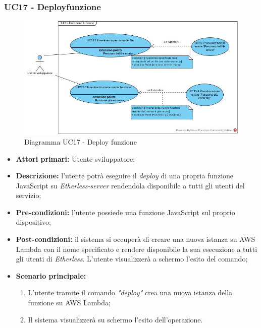 \subsubsection{UC17 - Deploy\glo funzione}
\begin{figure}[h]
	\centering
	\includegraphics[width=\linewidth]{res/img/UC15.jpg}
	\caption{Diagramma UC17 - Deploy funzione}
\end{figure}
\begin{itemize}
	\item \textbf{Attori primari:} Utente sviluppatore;
	\item \textbf{Descrizione:} l'utente potrà eseguire il \textit{deploy\glo} di una propria funzione JavaScript su \textit{Etherless-server} rendendola disponibile a tutti gli utenti del servizio; 
	\item \textbf{Pre-condizioni:} l'utente possiede una funzione JavaScript sul proprio dispositivo;
	\item \textbf{Post-condizioni:} il sistema si occuperà di creare una nuova istanza su AWS Lambda con il nome specificato e rendere disponibile la sua esecuzione a tutti gli utenti di \textit{Etherless}. L'utente visualizzerà a schermo l'esito del comando;
	\item \textbf{Scenario principale:} 
	\begin{enumerate}
		\item L'utente tramite il comando \textit{"deploy\glos"} crea una nuova istanza della funzione su AWS Lambda;
		\item Il sistema visualizzerà su schermo l'esito dell'operazione.
	\end{enumerate}
\end{itemize}